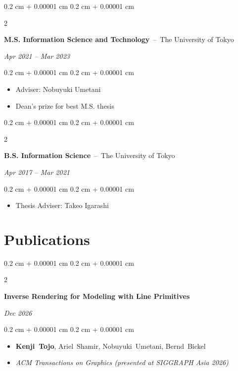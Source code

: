 \documentclass[10pt, letterpaper]{article}
\newenvironment{highlights}{
    \begin{itemize}[
        topsep=0.10 cm,
        parsep=0.10 cm,
        partopsep=0pt,
        itemsep=0pt,
        leftmargin=0.4 cm + 10pt
    ]
}{
    \end{itemize}
} %
\newenvironment{onecolentry}{
    \begin{adjustwidth}{
        0.2 cm + 0.00001 cm
    }{
        0.2 cm + 0.00001 cm
    }
}{
    \end{adjustwidth}
} %
\newenvironment{twocolentry}[2][]{
    \onecolentry
    \def\secondColumn{#2}
    \setcolumnwidth{\fill, 4.5 cm}
    \begin{paracol}{2}
}{
    \switchcolumn \raggedleft \secondColumn
    \end{paracol}
    \endonecolentry
} %
\newenvironment{shorttwocolentry}[2][]{
    \onecolentry
    \def\secondColumn{#2}
    \setcolumnwidth{\fill, 2.5 cm}
    \begin{paracol}{2}
}{
    \switchcolumn \raggedleft \secondColumn
    \end{paracol}
    \endonecolentry
} %
\begin{document}
        \vspace{0.20 cm}
        \begin{twocolentry}{
        \textit{Apr 2021 – Mar 2023}}
            \textbf{M.S. Information Science and Technology}
            \,--\, The University of Tokyo
        \end{twocolentry}
        \vspace{0.10 cm}
        \begin{onecolentry}
            \begin{highlights}
                \item Adviser: Nobuyuki Umetani
                \item Dean's prize for best M.S. thesis
            \end{highlights}
        \end{onecolentry}

        \vspace{0.20 cm}
        \begin{twocolentry}{
        \textit{Apr 2017 – Mar 2021}}
            \textbf{B.S. Information Science}
            \,--\, The University of Tokyo
        \end{twocolentry}
        \vspace{0.10 cm}
        \begin{onecolentry}
            \begin{highlights}
                \item Thesis Adviser: Takeo Igarashi
            \end{highlights}
        \end{onecolentry}

    \section{Publications}

        \begin{samepage}
            \begin{shorttwocolentry}{\textit{Dec 2026}}
                \textbf{Inverse Rendering for Modeling with Line Primitives}
            \end{shorttwocolentry}
            \vspace{0.10 cm}
            \begin{onecolentry}
                \begin{highlights}
                    \item \mbox{\textbf{Kenji Tojo}}, \mbox{Ariel Shamir}, \mbox{Nobuyuki Umetani}, \mbox{Bernd Bickel}
                    \item \textit{ACM Transactions on Graphics (presented at SIGGRAPH Asia 2026)}
                \end{highlights}
            \end{onecolentry}
        \end{samepage}
\end{document}

